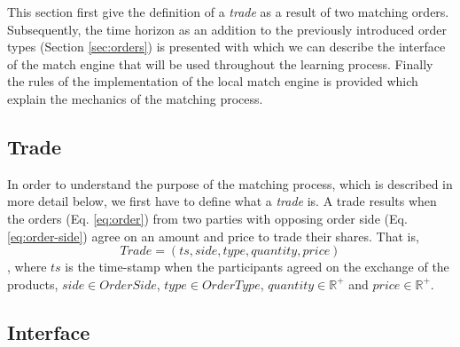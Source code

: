 This section first give the definition of a \textit{trade} as a result of two matching orders.
Subsequently, the time horizon as an addition to the previously introduced order types (Section \ref{sec:orders}) is presented with which we can describe the interface of the match engine that will be used throughout the learning process.
Finally the rules of the implementation of the local match engine is provided which explain the mechanics of the matching process.

\subsection{Trade}

In order to understand the purpose of the matching process, which is described in more detail below, we first have to define what a \textit{trade} is.
A trade results when the orders (Eq. \ref{eq:order}) from two parties with opposing order side (Eq. \ref{eq:order-side}) agree on an amount and price to trade their shares.
That is,
\begin{equation}\label{eq:trade}
    Trade=(ts, side, type, quantity, price )
\end{equation}
, where $ts$ is the time-stamp when the participants agreed on the exchange of the products, $side \in OrderSide$, $type \in OrderType$, $quantity \in \mathbb{R^+}$ and $price \in \mathbb{R^+}$.

\subsection{Interface}
\label{sec:match-engine-interface}

